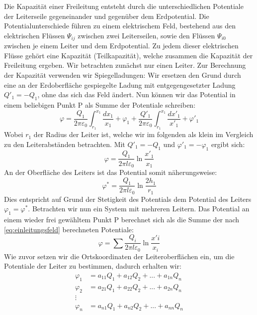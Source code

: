  Die Kapazität einer Freileitung entsteht durch die unterschiedlichen Potentiale der Leiterseile gegeneinander und gegenüber dem Erdpotential. Die Potentialunterschiede führen zu einem elektrischem Feld, bestehend aus den elektrischen Flüssen $\Psi_{ij}$ zwischen zwei Leiterseilen, sowie den Flüssen $\Psi_{i0}$ zwischen je einem Leiter und dem Erdpotential. Zu jedem dieser elektrischen Flüsse gehört eine Kapazität (Teilkapazität), welche zusammen die Kapazität der Freileitung ergeben.
Wir betrachten zunächst nur einen Leiter. Zur Berechnung der Kapazität verwenden wir Spiegelladungen: Wir ersetzen den Grund durch eine an der Erdoberfläche gespiegelte Ladung mit entgegengesetzter Ladung $Q'_1 = - Q_1$, ohne das sich das Feld ändert. Nun können wir das Potential in einem beliebigen Punkt P als Summe der Potentiale schreiben:
\begin{equation}
\varphi = \frac{Q_1}{2\pi\varepsilon_0} \int^{x_1}_{r_1} \frac{dx_1}{x_1} + \varphi_1 + \frac{Q'_1}{2\pi\varepsilon_0} \int^{x_1}_{r_1} \frac{dx'_1}{x'_1} + \varphi'_1
\end{equation}
Wobei $r_1$ der Radius der Leiter ist, welche wir im folgenden als klein im Vergleich zu den Leiterabständen betrachten. Mit $Q'_1 = - Q_1$ und $\varphi'_1 = - \varphi_1$ ergibt sich:
\begin{equation}\label{eq:einleitungsfeld}
\varphi = \frac{Q_1}{2\pi l\varepsilon_0} \ln \frac{x'_1}{x_1}
\end{equation}
An der Oberfläche des Leiters ist das Potential somit näherungsweise:
\begin{equation}
\varphi^* = \frac{Q_1}{2\pi l\varepsilon_0} \ln \frac{2h_1}{r_1}
\end{equation}
Dies entspricht auf Grund der Stetigkeit des Potentials
dem Potential des Leiters $\varphi_1 = \varphi^*$.
Betrachten wir nun ein System mit mehreren Leitern. Das Potential an einem wieder frei gewähltem Punkt P berechnet sich als die Summe der nach \eqref{eq:einleitungsfeld} berechneten Potentiale:
\begin{equation}
\varphi = \sum \frac{Q_i}{2\pi l\varepsilon_0} \ln \frac{x'i}{x_i}
\end{equation}
Wie zuvor setzen wir die Ortskoordinaten der Leiteroberflächen ein, um die Potentiale der Leiter zu bestimmen, dadurch erhalten wir:
\begin{align}
\varphi_1 &= a_{11} Q_1 + a_{12} Q_{2} + ... + a_{1n} Q_n \\
\varphi_2 &= a_{21} Q_1 + a_{22} Q_{2} + ... + a_{2n} Q_n \\
\vdots \\
\varphi_n &= a_{n1} Q_1 + a_{n2} Q_{2} + ... + a_{nn} Q_n
\end{align}
